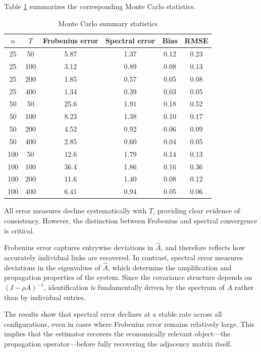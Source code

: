 \documentclass[12pt]{article}
\numberwithin{equation}{section}
\begin{document}
Table \ref{tab:mc_summary} summarizes the corresponding Monte Carlo statistics.

\begin{table}[H]
\centering
\caption{Monte Carlo summary statistics}
\label{tab:mc_summary}
\begin{tabular}{cccccc}
\toprule
$n$ & $T$ & Frobenius error & Spectral error & Bias & RMSE \\
\midrule
25 & 50  & 5.87 & 1.37 & 0.12 & 0.23 \\
25 & 100 & 3.12 & 0.89 & 0.08 & 0.13 \\
25 & 200 & 1.85 & 0.57 & 0.05 & 0.08 \\
25 & 400 & 1.34 & 0.39 & 0.03 & 0.05 \\
50 & 50  & 25.6 & 1.91 & 0.18 & 0.52 \\
50 & 100 & 8.23 & 1.38 & 0.10 & 0.17 \\
50 & 200 & 4.52 & 0.92 & 0.06 & 0.09 \\
50 & 400 & 2.85 & 0.60 & 0.04 & 0.05 \\
100 & 50  & 12.6 & 1.79 & 0.14 & 0.13 \\
100 & 100 & 36.4 & 1.86 & 0.16 & 0.36 \\
100 & 200 & 11.6 & 1.40 & 0.08 & 0.12 \\
100 & 400 & 6.41 & 0.94 & 0.05 & 0.06 \\
\bottomrule
\end{tabular}
\end{table}

All error measures decline systematically with $T$, providing clear evidence of consistency. However, the distinction between Frobenius and spectral convergence is critical.

Frobenius error captures entrywise deviations in $\hat A$, and therefore reflects how accurately individual links are recovered. In contrast, spectral error measures deviations in the eigenvalues of $\hat A$, which determine the amplification and propagation properties of the system. Since the covariance structure depends on $(I - \rho A)^{-1}$, identification is fundamentally driven by the spectrum of $A$ rather than by individual entries.

The results show that spectral error declines at a stable rate across all configurations, even in cases where Frobenius error remains relatively large. This implies that the estimator recovers the economically relevant object—the propagation operator—before fully recovering the adjacency matrix itself.
\end{document}
